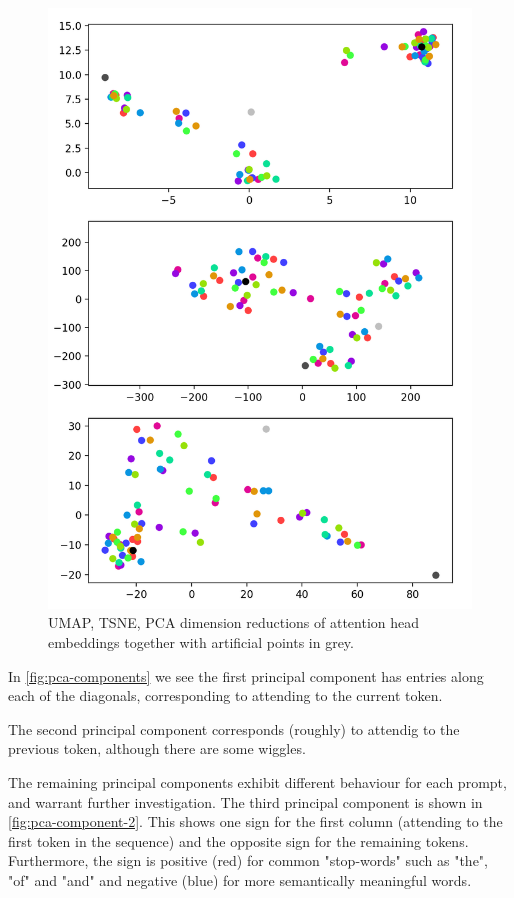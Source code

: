 \documentclass{article}
\begin{document}
\begin{figure}
    \includegraphics[width=\textwidth]{images/umap-tsne-pca.png}
    \caption{UMAP, TSNE, PCA dimension reductions of attention head embeddings together with artificial points in grey.}
    \label{fig:umap-tsne-pca}
\end{figure}

In \ref{fig:pca-components} we see the first principal component has entries along each of the diagonals, corresponding to attending to the current token.

The second principal component corresponds (roughly) to attendig to the previous token, although there are some wiggles.

The remaining principal components exhibit different behaviour for each prompt, and warrant further investigation. The third principal component is shown in \ref{fig:pca-component-2}. This shows one sign for the first column (attending to the first token in the sequence) and the opposite sign for the remaining tokens. Furthermore, the sign is positive (red) for common "stop-words" such as "the", "of" and "and" and negative (blue) for more semantically meaningful words.
\end{document}
